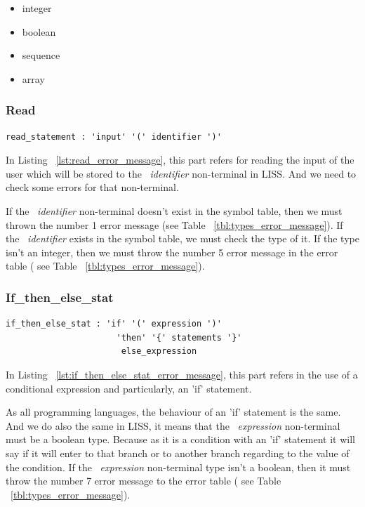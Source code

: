 \documentclass[
  oneside,
  11pt, a4paper,
  footinclude=true,
  headinclude=true,
  cleardoublepage=empty
]{scrbook}
\begin{document}
\begin{itemize}
\item integer
\item boolean
\item sequence
\item array
\end{itemize}

\subsubsection{Read}

\begin{lstlisting}[caption={Read rule in LISS},label={lst:read_error_message}]
  read_statement : 'input' '(' identifier ')'
\end{lstlisting}

In Listing ~\ref{lst:read_error_message}, this part refers for reading the input of the user which will be stored to the ~\textit{identifier} non-terminal in LISS.
And we need to check some errors for that non-terminal.

If the ~\textit{identifier} non-terminal doesn't exist in the symbol table, then we must thrown the number 1 error message (see Table ~\ref{tbl:types_error_message}).
If the ~\textit{identifier} exists in the symbol table, we must check the type of it.
If the type isn't an integer, then we must throw the number 5 error message in the error table ( see Table ~\ref{tbl:types_error_message}).

\subsubsection{If\_then\_else\_stat}

\begin{lstlisting}[caption={If\_then\_else\_stat rule in LISS},label={lst:if_then_else_stat_error_message}]
  if_then_else_stat : 'if' '(' expression ')'
                      'then' '{' statements '}'
                       else_expression
\end{lstlisting}

In Listing ~\ref{lst:if_then_else_stat_error_message}, this part refers in the use of a conditional expression and particularly, an 'if' statement.

As all programming languages, the behaviour of an 'if' statement is the same. And we do also the same in LISS, it means that the ~\textit{expression} non-terminal must be a boolean type. Because as it is a condition with an 'if' statement it will say if it will enter to that branch or to another branch regarding to the value of the condition. If the ~\textit{expression} non-terminal type isn't a boolean, then it must throw the number 7 error message to the error table ( see Table ~\ref{tbl:types_error_message}).
\end{document}
